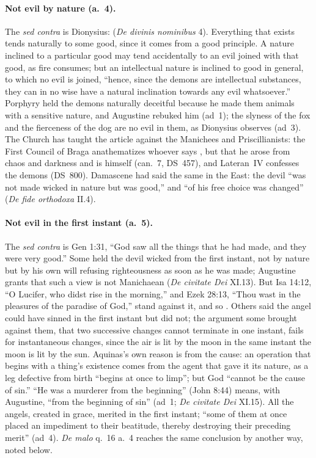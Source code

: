 \paragraph{Not evil by nature (a.~4).} The \emph{sed contra} is
Dionysius:  (\emph{De divinis
nominibus} 4). Everything that exists tends naturally to some good,
since it comes from a good principle. A nature inclined to a particular
good may tend accidentally to an evil joined with that good, as fire
consumes; but an intellectual nature is inclined to good in general, to
which no evil is joined, ``hence, since the demons are intellectual
substances, they can in no wise have a natural inclination towards any
evil whatsoever.'' Porphyry held the demons naturally deceitful because
he made them animals with a sensitive nature, and Augustine rebuked him
(ad~1); the slyness of the fox and the fierceness of the dog are no evil
in them, as Dionysius observes (ad~3). The Church has taught the article
against the Manichees and Priscillianists: the First Council of Braga
anathematizes whoever says , but that
he arose from chaos and darkness and is himself  (can.~7, DS~457), and Lateran~IV confesses the
demons  (DS~800). Damascene had said
the same in the East: the devil ``was not made wicked in nature but was
good,'' and ``of his free choice was changed'' (\emph{De fide orthodoxa}
II.4).

\paragraph{Not evil in the first instant (a.~5).} The \emph{sed contra}
is Gen 1:31, ``God saw all the things that he had made, and they were
very good.'' Some held the devil wicked from the first instant, not by
nature but by his own will refusing righteousness as soon as he was
made; Augustine grants that such a view is not Manichaean (\emph{De
civitate Dei} XI.13). But Isa 14:12, ``O Lucifer, who
didst rise in the morning,'' and Ezek 28:13, ``Thou wast in the
pleasures of the paradise of God,'' stand against it, and so
. Others said the angel could have sinned in the first instant but
did not; the argument some brought against them, that two successive
changes cannot terminate in one instant, fails for instantaneous
changes, since the air is lit by the moon in the same instant the moon
is lit by the sun. Aquinas's own reason is from the cause: an operation
that begins with a thing's existence comes from the agent that gave it
its nature, as a leg defective from birth ``begins at once to limp''; but
God ``cannot be the cause of sin.'' ``He was a murderer from the
beginning'' (John 8:44) means, with Augustine, ``from the beginning of
sin'' (ad~1; \emph{De civitate Dei} XI.15). All the angels, created in
grace, merited in the first instant; ``some of them at once placed an
impediment to their beatitude, thereby destroying their preceding
merit'' (ad~4). \emph{De malo} q.~16 a.~4 reaches the same conclusion by
another way, noted below.

